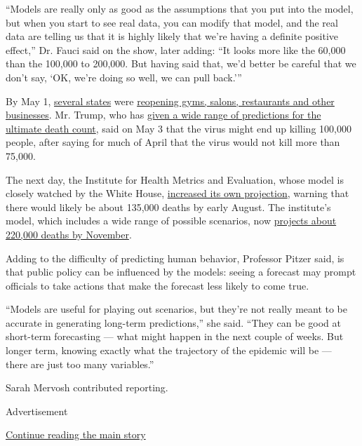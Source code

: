 ``Models are really only as good as the assumptions that you put into
the model, but when you start to see real data, you can modify that
model, and the real data are telling us that it is highly likely that
we're having a definite positive effect,'' Dr. Fauci said on the show,
later adding: ``It looks more like the 60,000 than the 100,000 to
200,000. But having said that, we'd better be careful that we don't say,
`OK, we're doing so well, we can pull back.'''

By May 1,
\href{https://www.nytimes.com/2020/04/20/us/coronavirus-us-hot-spots-reopening.html}{several
states} were
\href{https://www.nytimes.com/interactive/2020/us/states-reopen-map-coronavirus.html}{reopening
gyms, salons, restaurants and other businesses}. Mr. Trump, who has
\href{https://www.cnn.com/2020/05/04/politics/trump-rising-coronavirus-death-estimates/index.html}{given
a wide range of predictions for the ultimate death count}, said on May 3
that the virus might end up killing 100,000 people, after saying for
much of April that the virus would not kill more than 75,000.

The next day, the Institute for Health Metrics and Evaluation, whose
model is closely watched by the White House,
\href{http://www.healthdata.org/news-release/new-ihme-forecast-projects-nearly-135000-covid-19-deaths-us}{increased
its own projection}, warning that there would likely be about 135,000
deaths by early August. The institute's model, which includes a wide
range of possible scenarios, now
\href{https://covid19.healthdata.org/united-states-of-america}{projects
about 220,000 deaths by November}.

Adding to the difficulty of predicting human behavior, Professor Pitzer
said, is that public policy can be influenced by the models: seeing a
forecast may prompt officials to take actions that make the forecast
less likely to come true.

``Models are useful for playing out scenarios, but they're not really
meant to be accurate in generating long-term predictions,'' she said.
``They can be good at short-term forecasting --- what might happen in
the next couple of weeks. But longer term, knowing exactly what the
trajectory of the epidemic will be ---~ there are just too many
variables.''

Sarah Mervosh contributed reporting.

Advertisement

\protect\hyperlink{after-bottom}{Continue reading the main story}

